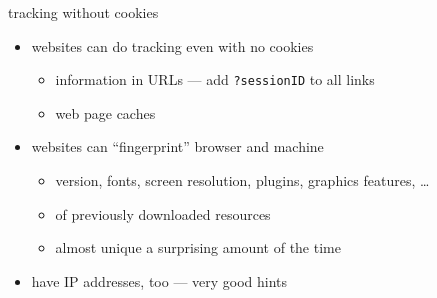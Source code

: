 
\begin{frame}[fragile,label=noCookieTrack]{tracking without cookies}
    \begin{itemize}
    \item websites can do tracking even with no cookies
        \begin{itemize}
        \item information in URLs --- add \texttt{?sessionID} to all links
        \item web page caches
        \end{itemize}
    \item websites can ``fingerprint'' browser and machine
        \begin{itemize}
        \item version, fonts, screen resolution, plugins, graphics features, \ldots
        \item {} of previously downloaded resources
        \item almost unique a surprising amount of the time
        \end{itemize}
    \item have IP addresses, too --- very good hints
    \end{itemize}
\end{frame}
